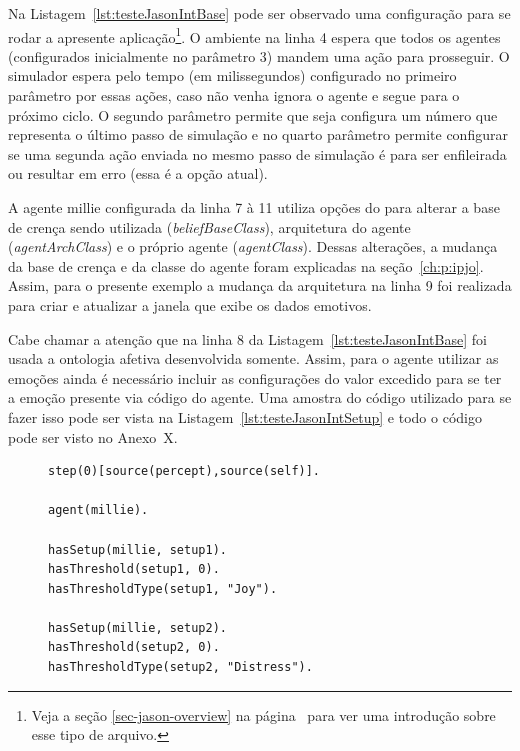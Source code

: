 Na Listagem~\ref{lst:testeJasonIntBase} pode ser observado uma configuração
para se rodar a apresente aplicação\footnote{Veja a seção
\ref{sec-jason-overview} na página~\pageref{sec-jason-overview}
para ver uma introdução sobre esse tipo de arquivo.}. O ambiente na linha 4
espera que todos os agentes (configurados inicialmente no parâmetro 3) mandem
uma ação para prosseguir. O simulador espera pelo tempo (em milissegundos)
configurado no primeiro parâmetro por essas ações, caso não venha ignora o
agente e segue para o próximo ciclo. O segundo parâmetro permite que seja
configura um número que representa o último passo de simulação e no quarto
parâmetro permite configurar se uma segunda ação enviada no mesmo passo de
simulação é para ser enfileirada ou resultar em erro (essa é a opção atual).

\begin{center}
    \begin{minipage}{130mm}
	\lstset{linewidth=130mm}
	
    \end{minipage}
\end{center}

A agente millie configurada da linha 7 à 11 utiliza opções do \jason para
alterar a base de crença sendo utilizada (\emph{beliefBaseClass}),
arquitetura do agente (\emph{agentArchClass}) e o próprio agente
(\emph{agentClass}). Dessas alterações, a mudança da base de crença e da
classe do agente foram explicadas na seção~\ref{ch:p:ipjo}. Assim, para o presente exemplo a mudança da arquitetura na linha 9
foi realizada para criar e atualizar a janela que exibe os dados emotivos.

Cabe chamar a atenção que na linha 8 da Listagem~\ref{lst:testeJasonIntBase}
foi usada a ontologia afetiva desenvolvida somente. Assim, para o agente
utilizar as emoções ainda é necessário incluir as configurações do valor
excedido para se ter a emoção presente via código do agente. Uma amostra do
código utilizado para se fazer isso pode ser vista na
Listagem~\ref{lst:testeJasonIntSetup} e todo o código pode ser visto no
Anexo~X.

\lstset{linewidth=80mm}
\begin{figure}
	\begin{lstlisting}[frame=trbl,
caption=Parte do código do agente para aplicação interativa de teste,
label=lst:testeJasonIntSetup]
step(0)[source(percept),source(self)].

agent(millie).

hasSetup(millie, setup1).
hasThreshold(setup1, 0).
hasThresholdType(setup1, "Joy").

hasSetup(millie, setup2).
hasThreshold(setup2, 0).
hasThresholdType(setup2, "Distress").
	\end{lstlisting}
\end{figure}

